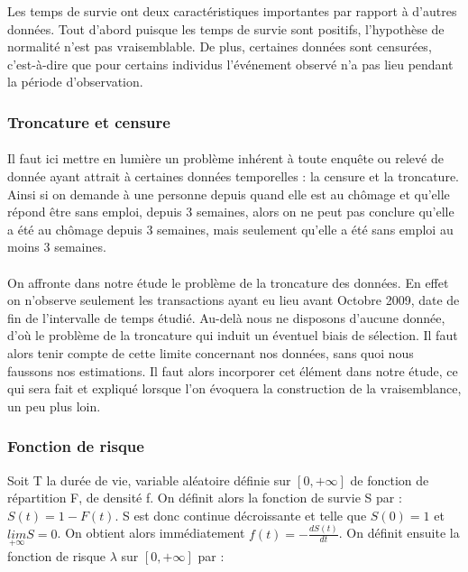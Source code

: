 \documentclass[12pt,a4paper]{article}
\begin{document}
Les temps de survie ont deux caractéristiques importantes par rapport à d’autres données. Tout d’abord puisque les temps de survie sont positifs, l’hypothèse de normalité n’est pas vraisemblable. De plus, certaines données sont censurées, c’est-à-dire que pour certains individus l’événement observé n’a pas lieu pendant la période d’observation.

\subsubsection{Troncature et censure}

\paragraph{}

Il faut ici mettre en lumière un problème inhérent à toute enquête ou relevé de donnée ayant attrait à certaines données temporelles : la censure et la troncature. Ainsi si on demande à une personne depuis quand elle est au chômage et qu’elle répond être sans emploi, depuis 3 semaines, alors on ne peut pas conclure qu’elle a été au chômage depuis 3 semaines, mais seulement qu’elle a été sans emploi au moins 3 semaines. 

\paragraph{}

On affronte dans notre étude le problème de la troncature des données. En effet on n’observe seulement les transactions ayant eu lieu avant Octobre 2009, date de fin de l’intervalle de temps étudié. Au-delà nous ne disposons d’aucune donnée, d’où le problème de la troncature qui induit un éventuel biais de sélection. Il faut alors tenir compte de cette limite concernant nos données, sans quoi nous faussons nos estimations. Il faut alors incorporer cet élément dans notre étude, ce qui sera fait et expliqué lorsque l’on évoquera la construction de la vraisemblance, un peu plus loin. 

\subsubsection{Fonction de risque}

Soit T la durée de vie, variable aléatoire définie sur $\left[0,+\infty\right]$ de fonction de répartition F, de densité f. On définit alors la fonction de survie S par : $S\left(t\right)=1-F\left(t\right)$. S est donc continue décroissante et telle que $S\left(0\right)=1$ et $\underset{+\infty}{lim}S=0$. On obtient alors immédiatement $f\left(t\right)=-\frac{dS\left(t\right)}{dt}$.
On définit ensuite la fonction de risque $\lambda$ sur $\left[0,+\infty\right]$ par :
\end{document}
